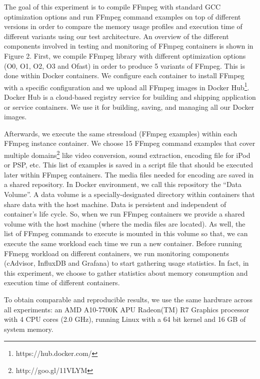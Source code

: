 The goal of this experiment is to compile FFmpeg with standard GCC optimization options and run FFmpeg command examples on top of different versions in order to compare the memory usage profiles and execution time of different variants using our test architecture. An overview of the different components involved in testing and monitoring of FFmpeg containers is shown in Figure 2. 
First, we compile FFmpeg library with different optimization options  (O0, O1, O2, O3 and Ofast) in order to produce 5 variants of FFmpeg. This is done within Docker containers. We configure each container to install FFmpeg with a specific configuration and we upload all FFmpeg images in Docker Hub\footnote{https://hub.docker.com/}.
Docker Hub is a cloud-based registry service for building and shipping application or service containers. We use it for building, saving, and managing all our Docker images.

Afterwards, we execute the same stressload (FFmpeg examples) within each FFmpeg instance container. We choose 15 FFmpeg command examples that cover multiple domains\footnote{http://goo.gl/11VLYM} like video conversion, sound extraction, encoding file for iPod or PSP, etc. This list of examples is saved in a script file that should be executed later within FFmpeg containers. The media files needed for encoding are saved in a shared repository. In Docker environment, we call this repository the “Data Volume”. A data volume is a specially-designated directory within containers that share data with the host machine. Data is persistent and independent of container's life cycle. So, when we run FFmpeg containers we provide a shared volume with the host machine (where the media files are located). As well, the list of FFmpeg commands to execute is mounted in this volume so that, we can execute the same workload each time we run a new container.
Before running FFmepg workload on different containers, we run monitoring components (cAdvisor, InfluxDB and Grafana) to start gathering usage statistics.
In fact, in this experiment, we choose to gather statistics about memory consumption and execution time of different containers. 

To obtain comparable and reproducible results, we use the same hardware across all experiments: an AMD A10-7700K APU Radeon(TM) R7 Graphics processor with 4 CPU cores (2.0 GHz), running Linux with a 64 bit kernel and 16 GB of system memory.

